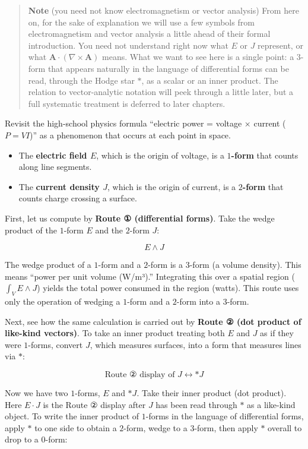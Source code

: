 \begin{quote}
\textbf{Note} (you need not know electromagnetism or vector analysis)
From here on, for the sake of explanation we will use a few symbols from
electromagnetism and vector analysis a little ahead of their formal
introduction. You need not understand right now what \(E\) or \(J\)
represent, or what \(\mathbf{A}\cdot(\nabla\times\mathbf{A})\) means.
What we want to see here is a single point: a \(3\)-form that appears
naturally in the language of differential forms can be read, through the
Hodge star \(\ast\), as a scalar or an inner product. The relation to
vector-analytic notation will peek through a little later, but a full
systematic treatment is deferred to later chapters.
\end{quote}

Revisit the high-school physics formula ``electric power = voltage ×
current (\(P=VI\))'' as a phenomenon that occurs at each point in space.

\begin{itemize}
\item
  The \textbf{electric field $E$}, which is the origin of voltage, is a
  \textbf{$1$-form} that counts along line segments.
\item
  The \textbf{current density $J$}, which is the origin of current, is a
  \textbf{$2$-form} that counts charge crossing a surface.
\end{itemize}

First, let us compute by \textbf{Route ① (differential forms)}. Take the
wedge product of the \(1\)-form \(E\) and the \(2\)-form \(J\):

\[E \wedge J\]

The wedge product of a \(1\)-form and a \(2\)-form is a \(3\)-form (a
volume density). This means ``power per unit volume (W/m³).''
Integrating this over a spatial region (\(\int_V E \wedge J\)) yields
the total power consumed in the region (watts). This route uses only the
operation of wedging a \(1\)-form and a \(2\)-form into a \(3\)-form.

Next, see how the same calculation is carried out by
\textbf{Route ② (dot product of like-kind vectors)}. To take an inner
product treating both \(E\) and \(J\) as if they were \(1\)-forms,
convert \(J\), which measures surfaces, into a form that measures lines
via \(\ast\):

\[\text{Route ② display of }J \longleftrightarrow \ast J\]

Now we have two \(1\)-forms, \(E\) and \(\ast J\). Take their inner
product (dot product). Here \(E\cdot J\) is the Route ② display after
\(J\) has been read through \(\ast\) as a like-kind object. To write the
inner product of \(1\)-forms in the language of differential forms,
apply \(\ast\) to one side to obtain a \(2\)-form, wedge to a
\(3\)-form, then apply \(\ast\) overall to drop to a \(0\)-form:

